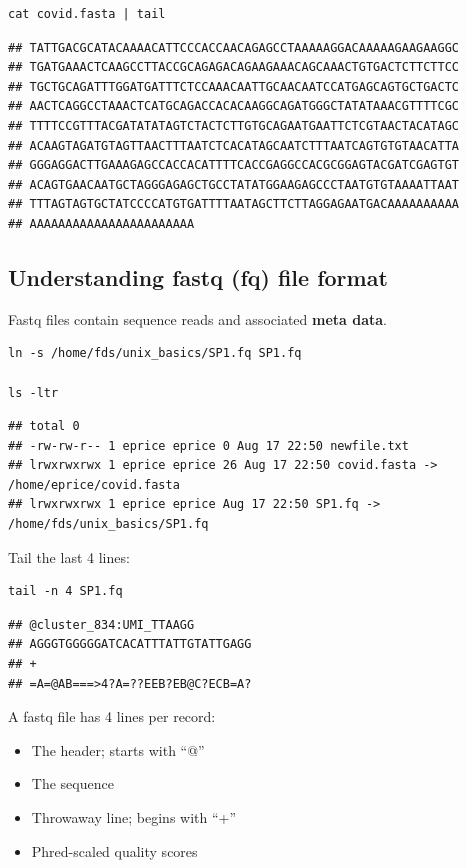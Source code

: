 \documentclass[
]{book}
\providecommand{\tightlist}{%
  \setlength{\itemsep}{0pt}\setlength{\parskip}{0pt}}
\begin{document}
\begin{verbatim}
cat covid.fasta | tail
\end{verbatim}

\begin{verbatim}
## TATTGACGCATACAAAACATTCCCACCAACAGAGCCTAAAAAGGACAAAAAGAAGAAGGC
## TGATGAAACTCAAGCCTTACCGCAGAGACAGAAGAAACAGCAAACTGTGACTCTTCTTCC
## TGCTGCAGATTTGGATGATTTCTCCAAACAATTGCAACAATCCATGAGCAGTGCTGACTC
## AACTCAGGCCTAAACTCATGCAGACCACACAAGGCAGATGGGCTATATAAACGTTTTCGC
## TTTTCCGTTTACGATATATAGTCTACTCTTGTGCAGAATGAATTCTCGTAACTACATAGC
## ACAAGTAGATGTAGTTAACTTTAATCTCACATAGCAATCTTTAATCAGTGTGTAACATTA
## GGGAGGACTTGAAAGAGCCACCACATTTTCACCGAGGCCACGCGGAGTACGATCGAGTGT
## ACAGTGAACAATGCTAGGGAGAGCTGCCTATATGGAAGAGCCCTAATGTGTAAAATTAAT
## TTTAGTAGTGCTATCCCCATGTGATTTTAATAGCTTCTTAGGAGAATGACAAAAAAAAAA
## AAAAAAAAAAAAAAAAAAAAAAA
\end{verbatim}

\hypertarget{understanding-fastq-fq-file-format}{%
\subsection{Understanding fastq (fq) file format}\label{understanding-fastq-fq-file-format}}

Fastq files contain sequence reads and associated \textbf{meta data}.

\begin{verbatim}
ln -s /home/fds/unix_basics/SP1.fq SP1.fq

ls -ltr
\end{verbatim}

\begin{verbatim}
## total 0
## -rw-rw-r-- 1 eprice eprice 0 Aug 17 22:50 newfile.txt
## lrwxrwxrwx 1 eprice eprice 26 Aug 17 22:50 covid.fasta -> /home/eprice/covid.fasta 
## lrwxrwxrwx 1 eprice eprice Aug 17 22:50 SP1.fq -> /home/fds/unix_basics/SP1.fq
\end{verbatim}

Tail the last 4 lines:

\begin{verbatim}
tail -n 4 SP1.fq
\end{verbatim}

\begin{verbatim}
## @cluster_834:UMI_TTAAGG
## AGGGTGGGGGATCACATTTATTGTATTGAGG 
## +
## =A=@AB===>4?A=??EEB?EB@C?ECB=A?
\end{verbatim}

A fastq file has 4 lines per record:

\begin{itemize}
\tightlist
\item
  The header; starts with ``@''
\item
  The sequence
\item
  Throwaway line; begins with ``+''
\item
  Phred-scaled quality scores
\end{itemize}
\end{document}
